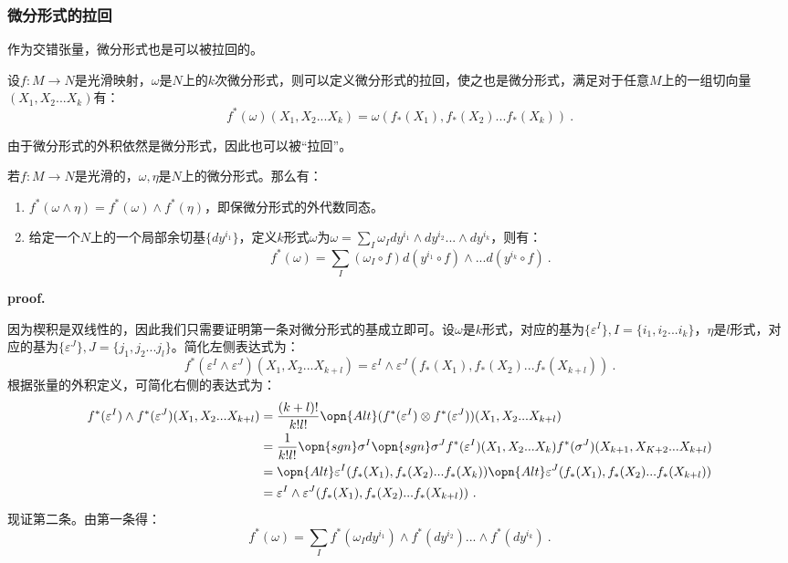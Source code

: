 \subsubsection{微分形式的拉回}
作为交错张量，微分形式也是可以被拉回的。
\begin{definition}{}
设$f:M\rightarrow N$是光滑映射，$\omega$是$N$上的$k$次微分形式，则可以定义微分形式的拉回，使之也是微分形式，满足对于任意$M$上的一组切向量$(X_1,X_2...X_k)$有：
\begin{equation}
f^*(\omega)(X_1,X_2...X_k)=\omega(f_*(X_1),f_*(X_2)...f_*(X_k))~.
\end{equation}
\end{definition}
由于微分形式的外积依然是微分形式，因此也可以被“拉回”。
\begin{theorem}{}\label{the_PullBk_1}
若$f:M\rightarrow N$是光滑的，$\omega,\eta$是$N$上的微分形式。那么有：
\begin{enumerate}
\item $f^*(\omega\wedge \eta)=f^*(\omega)\wedge f^*(\eta)$，即保微分形式的外代数同态。
\item 给定一个$N$上的一个局部余切基$\{dy^{i_1}\}$，定义$k$形式$\omega$为$\omega=\sum_I\omega_I dy^{i_1}\wedge dy^{i_2}...\wedge dy^{i_k}$，则有：
\begin{equation}
f^*(\omega)=\sum_I (\omega_I\circ f)d(y^{i_1}\circ f)\wedge...d(y^{i_k}\circ f)~.
\end{equation}
\end{enumerate}
\end{theorem}
\textbf{proof.}

因为楔积是双线性的，因此我们只需要证明第一条对微分形式的基成立即可。设$\omega$是$k$形式，对应的基为$\{\varepsilon^I\},I=\{i_1,i_2...i_k\}$，$\eta$是$l$形式，对应的基为$\{\varepsilon^J\},J=\{j_1,j_2...j_l\}$。简化左侧表达式为：
\begin{equation}
f^*(\varepsilon^I\wedge \varepsilon^J)(X_{1},X_{2}...X_{k+l})=\varepsilon^I\wedge \varepsilon^J(f_*(X_{1}),f_*(X_{2})...f_*(X_{k+l}))~.
\end{equation}
根据张量的外积定义，可简化右侧的表达式为：
\begin{equation}
\begin{aligned}
f^*(\varepsilon^I)\wedge f^*(\varepsilon^J)(X_{1},X_{2}...X_{k+l})&=\frac{(k+l)!}{k!l!}\opn{Alt}(f^*(\varepsilon^I)\otimes f^*(\varepsilon^J))(X_{1},X_{2}...X_{k+l})\\
&=\frac{1}{k!l!}\opn{sgn}\sigma^I\opn{sgn}\sigma^Jf^*(\varepsilon^I)(X_1,X_2...X_k)f^*(\sigma^J)(X_{k+1},X_{K+2}...X_{k+l})\\
&=\opn{Alt}\varepsilon^I(f_*(X_1),f_*(X_2)...f_*(X_k))\opn{Alt}\varepsilon^J(f_*(X_1),f_*(X_2)...f_*(X_{k+l}))\\
&=\varepsilon^I\wedge\varepsilon^J(f_*(X_{1}),f_*(X_{2})...f_*(X_{k+l}))~.
\end{aligned}
\end{equation}
现证第二条。由第一条得：
\begin{equation}
f^*(\omega)=\sum_If^*(\omega_I dy^{i_1} )\wedge f^*(dy^{i_2})...\wedge f^*(dy^{i_k})~.
\end{equation}

